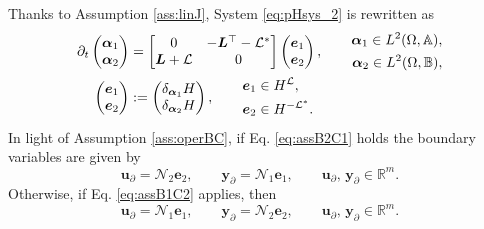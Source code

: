 Thanks to Assumption \ref{ass:linJ}, System \eqref{eq:pHsys_2} is rewritten as 
\begin{subequations}
	\label{eq:pHsys_ass} 
	\begin{align}
	\partial_t \begin{pmatrix}
	{\bm{\alpha}}_1 \\ {\bm{\alpha}}_2
	\end{pmatrix} &= \begin{bmatrix}
	0 & -\bm{L}^\top - \mathcal{L}^* \\
	\bm{L} + \mathcal{L} & 0 \\
	\end{bmatrix}\begin{pmatrix}
	\bm{e}_1 \\ \bm{e}_2
	\end{pmatrix} , \qquad \begin{aligned}
	\bm{\alpha}_1 \in L^2(\Omega, \mathbb{A}), 	\\
	\bm{\alpha}_2 \in L^2(\Omega, \mathbb{B}), 
	\end{aligned} \label{eq:pHsys_dyn_ass} \vspace{3pt}\\
	\begin{pmatrix}
	\bm{e}_1 \\ \bm{e}_2
	\end{pmatrix} &:= \begin{pmatrix}
	\delta_{\bm{\alpha}_1}H \\ \delta_{\bm{\alpha}_2}H
	\end{pmatrix} , \qquad \begin{aligned}
	\bm{e}_1 &\in H^\mathcal{L}, 	\\
	\bm{e}_2 &\in H^{-\mathcal{L}^*}.
	\end{aligned} \label{eq:pHsys_const_ass} 
	\end{align}
\end{subequations}
In light of Assumption \ref{ass:operBC}, if Eq. \eqref{eq:assB2C1} holds the boundary variables are given by 
\begin{equation}\label{eq:pHsys_assB2C1}
\bm{u}_\partial = \mathcal{N}_2 \displaystyle \bm{e}_2, \qquad  \bm{y}_\partial = \mathcal{N}_1 \displaystyle \bm{e}_1, \qquad  \bm{u}_\partial,\, \bm{y}_\partial \in \mathbb{R}^m.
\end{equation}
Otherwise, if Eq. \eqref{eq:assB1C2} applies, then
\begin{equation}\label{eq:pHsys_assB1C2}
\bm{u}_\partial = \mathcal{N}_1 \displaystyle \bm{e}_1, \qquad 
\bm{y}_\partial = \mathcal{N}_2 \displaystyle \bm{e}_2, \qquad  \bm{u}_\partial,\, \bm{y}_\partial \in \mathbb{R}^m. 
\end{equation}
